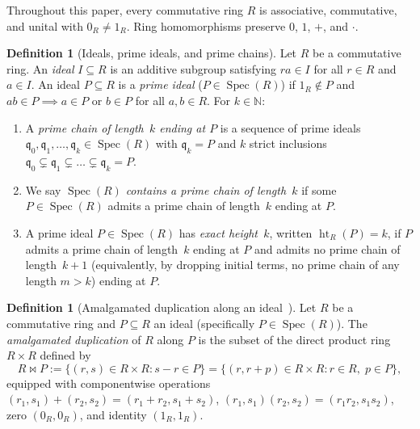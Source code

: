 \documentclass[11pt]{article}
\theoremstyle{definition}
\newtheorem{definition}[theorem]{Definition}
\newcommand{\Spec}{\operatorname{Spec}}
\newcommand{\htop}{\operatorname{ht}}
\newcommand{\NN}{\mathbb{N}}
\begin{document}
Throughout this paper, every commutative ring $R$ is associative, commutative, and unital
with $0_R \neq 1_R$. Ring homomorphisms preserve $0$, $1$, $+$, and $\cdot$.

\begin{definition}[Ideals, prime ideals, and prime chains]\label{def:prime-chains}
Let $R$ be a commutative ring. An \emph{ideal} $I \subseteq R$ is an additive subgroup
satisfying $r a \in I$ for all $r \in R$ and $a \in I$. An ideal $P \subseteq R$ is a
\emph{prime ideal} ($P \in \Spec(R)$) if $1_R \notin P$ and $ab \in P \implies a \in P$
or $b \in P$ for all $a, b \in R$. For $k \in \NN$:
\begin{enumerate}
  \item A \emph{prime chain of length~$k$ ending at $P$} is a sequence of prime ideals
  $\mathfrak{q}_0, \mathfrak{q}_1, \dots, \mathfrak{q}_k \in \Spec(R)$ with
  $\mathfrak{q}_k = P$ and $k$ strict inclusions
  $\mathfrak{q}_0 \subsetneq \mathfrak{q}_1 \subsetneq \dots \subsetneq \mathfrak{q}_k = P$.
  \item We say $\Spec(R)$ \emph{contains a prime chain of length~$k$} if some
  $P \in \Spec(R)$ admits a prime chain of length~$k$ ending at $P$.
  \item A prime ideal $P \in \Spec(R)$ has \emph{exact height~$k$}, written $\htop_R(P) = k$,
  if $P$ admits a prime chain of length~$k$ ending at $P$ and admits no prime chain of
  length~$k + 1$ (equivalently, by dropping initial terms, no prime chain of any length
  $m > k$) ending at $P$.
\end{enumerate}
\end{definition}

\begin{definition}[Amalgamated duplication along an ideal~\cite{DAnnaFontana2007}]\label{def:dup}
Let $R$ be a commutative ring and $P \subseteq R$ an ideal (specifically $P \in \Spec(R)$).
The \emph{amalgamated duplication} of $R$ along $P$ is the subset of the direct product
ring $R \times R$ defined by
\[
  R \bowtie P := \{(r, s) \in R \times R : s - r \in P\}
               = \{(r, r + p) \in R \times R : r \in R,\; p \in P\},
\]
equipped with componentwise operations $(r_1, s_1) + (r_2, s_2) = (r_1 + r_2, s_1 + s_2)$,
$(r_1, s_1)(r_2, s_2) = (r_1 r_2, s_1 s_2)$, zero $(0_R, 0_R)$, and identity $(1_R, 1_R)$.
\end{definition}
\end{document}
